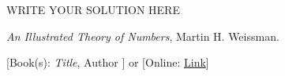 \documentclass[11pt]{article}
\theoremstyle{plain}
\theoremstyle{definition}
\theoremstyle{remark}
\numberwithin{equation}{problem}
\begin{document}
\begin{solution} %
WRITE YOUR SOLUTION HERE
\end{solution}\clearpage %




\begin{thebibliography}{9}  %
\emph{An Illustrated Theory of Numbers}, Martin H. Weissman.

[Book(s): \emph{Title}, Author ] or [Online: \href{http://example.com/}{Link}]
\end{thebibliography}  %
\end{document}

